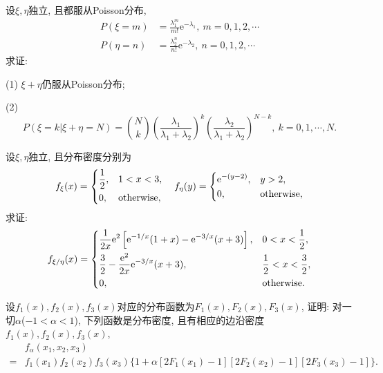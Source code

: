 \begin{yyEx}
	设$\xi,\eta$独立, 且都服从Poisson分布,\begin{align}
	P(\xi = m) &= \frac{\lambda_1^m}{m!}\mathrm{e}^{-\lambda_1},~m=0,1,2,\cdots\nonumber\\
	P(\eta = n) &= \frac{\lambda_2^n}{n!}\mathrm{e}^{-\lambda_2},~n=0,1,2,\cdots
	\end{align}
	求证:\begin{blist}
		\item[(1)] $\xi+\eta$仍服从Poisson分布;
		\item[(2)] \begin{equation}
		P(\xi=k|\xi+\eta=N) = \binom{N}{k}\left(\frac{\lambda_1}{\lambda_1+\lambda_2}\right)^k\left(\frac{\lambda_2}{\lambda_1+\lambda_2}\right)^{N-k},~k=0,1,\cdots,N.
		\end{equation}
	\end{blist}
\end{yyEx}

\begin{yyEx}
	设$\xi,\eta$独立, 且分布密度分别为
	\begin{equation}
	f_{\xi}(x) = \begin{dcases}
	\frac{1}{2}, &1<x<3,\\
	0,&\text{otherwise},
	\end{dcases}
	\quad f_{\eta}(y) = \begin{dcases}
	\mathrm{e}^{-(y-2)},&y>2,\\
	0,&\text{otherwise},
	\end{dcases}
	\end{equation}
	求证:\begin{equation}
	f_{\xi/\eta}(x) = \begin{dcases}
	\frac{1}{2x}\mathrm{e}^2\left[\mathrm{e}^{-1/x}(1+x)-\mathrm{e}^{-3/x}(x+3)\right], &0<x<\frac{1}{2},\\
	\frac{3}{2}-\frac{\mathrm{e}^{2}}{2x}\mathrm{e}^{-3/x}(x+3),&\frac{1}{2}<x<\frac{3}{2},\\
	0,&\text{otherwise}.
	\end{dcases}
	\end{equation}
\end{yyEx}

\begin{yyEx}
	设$f_1(x),f_2(x),f_3(x)$对应的分布函数为$F_1(x),F_2(x),F_3(x)$, 证明: 对一切$\alpha$($-1<\alpha<1$), 下列函数是分布密度, 且有相应的边沿密度$f_1(x),f_2(x),f_3(x)$,
	\begin{align}
	&f_{\alpha}(x_1,x_2,x_3) \nonumber\\
	=&f_1(x_1)f_2(x_2)f_3(x_3)\{ 1+\alpha[2F_1(x_1)-1][2F_2(x_2)-1][2F_3(x_3)-1] \}.
	\end{align}
\end{yyEx}

